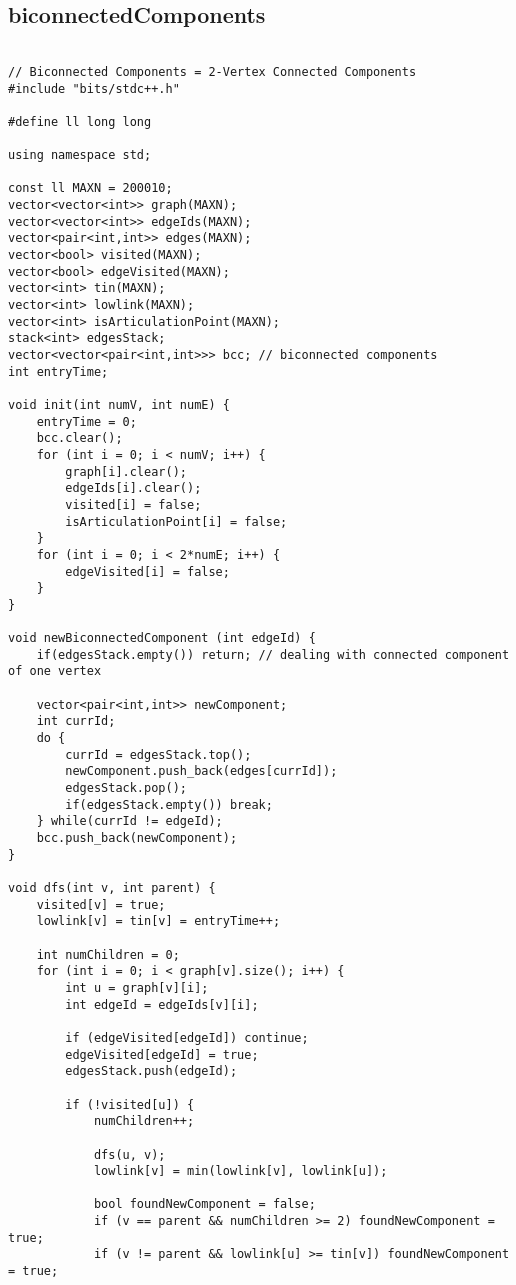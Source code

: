 \documentclass[landscape,twocolumn,10pt,a4paper]{article}
\begin{document}
\subsection{biconnectedComponents}
\begin{verbatim}

// Biconnected Components = 2-Vertex Connected Components
#include "bits/stdc++.h"

#define ll long long

using namespace std;

const ll MAXN = 200010;
vector<vector<int>> graph(MAXN);
vector<vector<int>> edgeIds(MAXN);
vector<pair<int,int>> edges(MAXN);
vector<bool> visited(MAXN);
vector<bool> edgeVisited(MAXN);
vector<int> tin(MAXN);
vector<int> lowlink(MAXN);
vector<int> isArticulationPoint(MAXN);
stack<int> edgesStack;
vector<vector<pair<int,int>>> bcc; // biconnected components
int entryTime;

void init(int numV, int numE) {
    entryTime = 0;
    bcc.clear();
    for (int i = 0; i < numV; i++) {
        graph[i].clear();
        edgeIds[i].clear();
        visited[i] = false;
        isArticulationPoint[i] = false;
    }
    for (int i = 0; i < 2*numE; i++) {
        edgeVisited[i] = false;
    }
}

void newBiconnectedComponent (int edgeId) {
    if(edgesStack.empty()) return; // dealing with connected component of one vertex
    
    vector<pair<int,int>> newComponent;
    int currId;
    do {
        currId = edgesStack.top();
        newComponent.push_back(edges[currId]);
        edgesStack.pop();
        if(edgesStack.empty()) break;
    } while(currId != edgeId);
    bcc.push_back(newComponent);
}

void dfs(int v, int parent) {
    visited[v] = true;
    lowlink[v] = tin[v] = entryTime++;

    int numChildren = 0;
    for (int i = 0; i < graph[v].size(); i++) {
        int u = graph[v][i];
        int edgeId = edgeIds[v][i];

        if (edgeVisited[edgeId]) continue;
        edgeVisited[edgeId] = true;
        edgesStack.push(edgeId);

        if (!visited[u]) {
            numChildren++;

            dfs(u, v);
            lowlink[v] = min(lowlink[v], lowlink[u]);

            bool foundNewComponent = false;
            if (v == parent && numChildren >= 2) foundNewComponent = true;
            if (v != parent && lowlink[u] >= tin[v]) foundNewComponent = true;


\end{verbatim}
\end{document}
